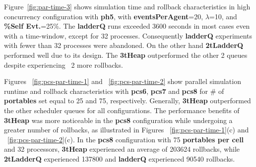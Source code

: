 Figure~\ref{fig:par-time-3} shows simulation time and rollback characteristics in high concurrency configuration with \textbf{ph5}, with
\textbf{eventsPerAgent}=20, $\lambda$=10, and \textbf{\%Self Evt.}=25\%. The \textbf{ladderQ} runs exceeded 3600 seconds in most cases even with a time-window, except for 32 processes. Consequently \textbf{ladderQ} experiments with fewer than 32 processes were abandoned. On the other
hand \textbf{2tLadderQ} performed well due to its design. The \textbf{3tHeap} outperformed the other 2 queues despite experiencing ~2\texttimes\/
more rollbacks.

Figures ~\ref{fig:pcs-par-time-1} and ~\ref{fig:pcs-par-time-2} show parallel simulation runtime and rollback characteristics with \textbf{pcs6}, \textbf{pcs7} and \textbf{pcs8} for \# of \textbf{portables} set equal to 25 and 75, respectively. Generally, \textbf{3tHeap} outperformed the other scheduler queues for all configurations. The performance benefits of \textbf{3tHeap} was more noticeable in the \textbf{pcs8} configuration while undergoing a greater number of rollbacks, as illustrated in Figures ~\ref{fig:pcs-par-time-1}(c) and ~\ref{fig:pcs-par-time-2}(c). In the \textbf{pcs8} configuration with 75 \textbf{portables per cell} and 32 processors, \textbf{3tHeap} experienced an average of 203624 rollbacks, while \textbf{2tLadderQ} experienced 137800 and \textbf{ladderQ} experienced 90540 rollbacks. 

